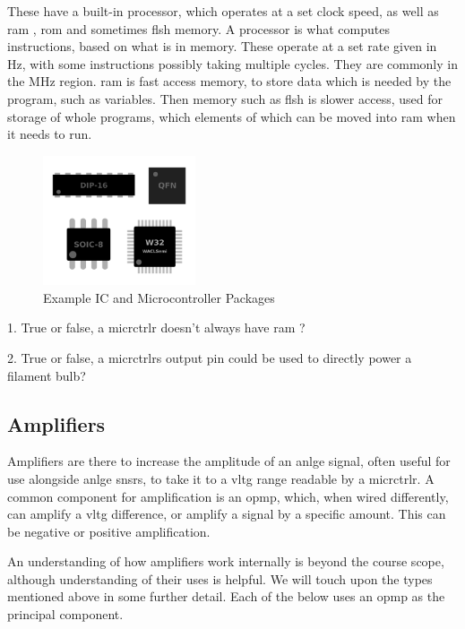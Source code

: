 \documentclass[a4paper,11pt]{report}
\newcommand{\Quiz}[1] %
{
\par\noindent %
\phantomsection %
\todo[inline, color=blue!30]{\textbf{#1}} %
\vspace{1em} %
}
\begin{document}
These have a built-in processor, which operates at a set clock speed, as well as \gls{ram} , \gls{rom}  and sometimes  \gls{flsh}  memory. A processor is what computes instructions, based on what is in memory. These operate at a set rate given in Hz, with some instructions possibly taking multiple cycles. They are commonly in the MHz region. \gls{ram} is fast access memory, to store data which is needed by the program, such as variables. Then memory such as  \gls{flsh}  is slower access, used for storage of whole programs, which elements of which can be moved into \gls{ram} when it needs to run.

\begin{figure}[H]
\centering
\includegraphics[width=0.4\textwidth]{icpackages}
\caption{Example IC and Microcontroller Packages}
\end{figure}

\Quiz{Quiz}

1. True or false, a \gls{micrctrlr} doesn't always have \gls{ram} ?

2. True or false, a \gls{micrctrlr}s output pin could be used to directly power a filament bulb?

\vspace*{1\baselineskip}

\subsection{Amplifiers}

Amplifiers are there to increase the amplitude of an \gls{anlge} signal, often useful for use alongside \gls{anlge} \gls{snsr}s, to take it to a \gls{vltg} range readable by a \gls{micrctrlr}. A common component for amplification is an \gls{opmp}, which, when wired differently, can amplify a \gls{vltg} difference, or amplify a signal by a specific amount. This can be negative or positive amplification.

An understanding of how amplifiers work internally is beyond the course scope, although understanding of their uses is helpful. We will touch upon the types mentioned above in some further detail. Each of the below uses an \gls{opmp} as the principal component.
\end{document}
